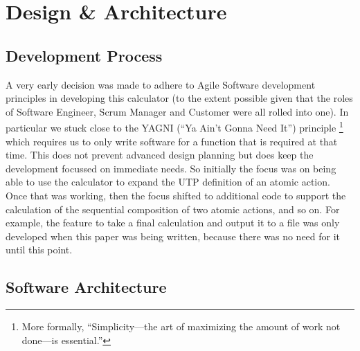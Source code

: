 \section{Design \& Architecture}\label{sec:Design}

\subsection{Development Process}\label{ssec:development}

A very early decision was made to adhere to Agile Software development
principles\cite{Fowl01a} in developing this calculator
(to the extent possible given that the roles of Software Engineer, Scrum Manager
and Customer were all rolled into one).
In particular we stuck close to the YAGNI (``Ya Ain't Gonna Need It'') principle%
\footnote{More formally, ``Simplicity---the art of maximizing the amount
of work not done---is essential.''}
which requires us to only write software for a function
that is required at that time.
This does not prevent advanced design planning but does keep
the development focussed on immediate needs.
So initially the focus was on being able to use the calculator
to expand the UTP definition of an atomic action.
Once that was working, then the focus shifted to additional code to
support the calculation of the sequential composition of two atomic actions,
and so on.
For example, the feature to take a final calculation and output it to a file
was only developed when this paper was being written,
because there was no need for it until this point.

\subsection{Software Architecture}\label{ssec:architecture}

